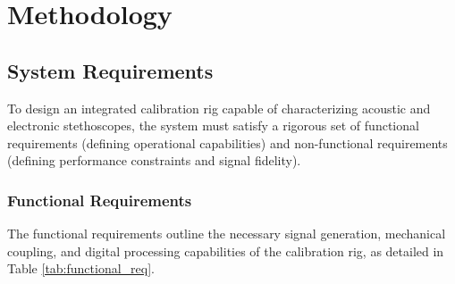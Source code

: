
\chapter{Methodology}	%
\label{Chapter3}	%



\section{System Requirements}
\label{sec:requirements}

To design an integrated calibration rig capable of characterizing acoustic and electronic stethoscopes, the system must satisfy a rigorous set of functional requirements (defining operational capabilities) and non-functional requirements (defining performance constraints and signal fidelity).

\subsection{Functional Requirements}

The functional requirements outline the necessary signal generation, mechanical coupling, and digital processing capabilities of the calibration rig, as detailed in Table \ref{tab:functional_req}.

